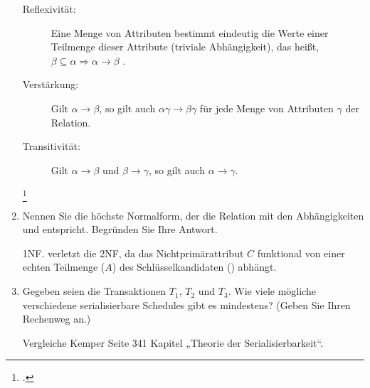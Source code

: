 \documentclass{lehramt-informatik-aufgabe}
\begin{document}
\begin{enumerate}
\begin{liAntwort}
\begin{description}
\item[Reflexivität:]
%
Eine Menge von Attributen bestimmt eindeutig die Werte einer Teilmenge
dieser Attribute (triviale Abhängigkeit), das heißt,
$\beta \subseteq \alpha \Rightarrow \alpha \rightarrow \beta$ .

\item[Verstärkung:]
%
Gilt
$\alpha \rightarrow \beta$, so gilt auch
$\alpha \gamma \rightarrow \beta \gamma$
für jede Menge von Attributen
$\gamma$ der
Relation.

\item[Transitivität:]
%
Gilt
$\alpha \rightarrow \beta$
und
$\beta \rightarrow \gamma$,
so gilt auch
$\alpha \rightarrow \gamma$.
\end{description}
\footcite[Axiome von Armstrong]{wiki:funktionale-abhängigkeit}
\end{liAntwort}


\item Nennen Sie die höchste Normalform, der die Relation  mit den Abhängigkeiten  und 
entspricht. Begründen Sie Ihre Antwort.

\begin{liAntwort}
1NF.  verletzt die 2NF, da das Nichtprimärattribut $C$
funktional von einer echten Teilmenge ($A$) des Schlüsselkandidaten
() abhängt.
\end{liAntwort}


\item Gegeben seien die Transaktionen $T_1$, $T_2$ und $T_3$. Wie viele
mögliche verschiedene serialisierbare Schedules gibt es mindestens?
(Geben Sie Ihren Rechenweg an.)

\begin{liAntwort}
Vergleiche Kemper Seite 341 Kapitel „Theorie der Serialisierbarkeit“.
\end{liAntwort}

\end{enumerate}
\end{document}
